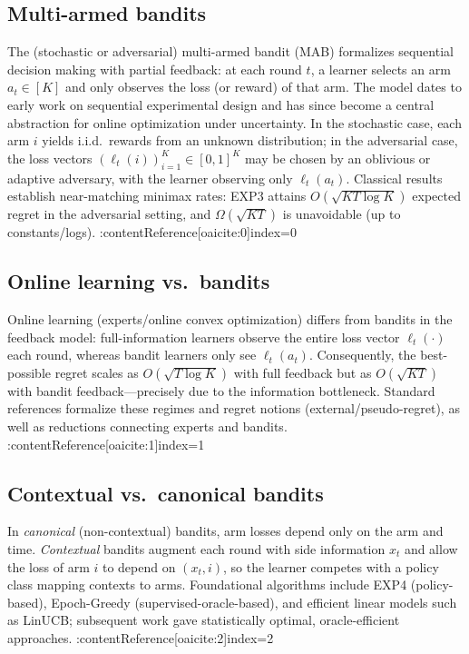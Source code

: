 \documentclass[10pt,twocolumn]{article}
\theoremstyle{definition}
\theoremstyle{remark}
\begin{document}
\subsection{Multi-armed bandits}
The (stochastic or adversarial) multi-armed bandit (MAB) formalizes sequential decision making with partial feedback: at each round $t$, a learner selects an arm $a_t\in[K]$ and only observes the loss (or reward) of that arm. The model dates to early work on sequential experimental design \citep{Robbins1952} and has since become a central abstraction for online optimization under uncertainty. In the stochastic case, each arm $i$ yields i.i.d.\ rewards from an unknown distribution; in the adversarial case, the loss vectors $(\ell_t(i))_{i=1}^K\in[0,1]^K$ may be chosen by an oblivious or adaptive adversary, with the learner observing only $\ell_t(a_t)$. Classical results establish near-matching minimax rates: EXP3 attains $O(\sqrt{KT\log K})$ expected regret in the adversarial setting, and $\Omega(\sqrt{KT})$ is unavoidable (up to constants/logs). \citep{Auer2002Nonstochastic,BubeckCesaBianchi2012,LS20}  :contentReference[oaicite:0]{index=0}

\subsection{Online learning vs.\ bandits}
Online learning (experts/online convex optimization) differs from bandits in the feedback model: full-information learners observe the entire loss vector $\ell_t(\cdot)$ each round, whereas bandit learners only see $\ell_t(a_t)$. Consequently, the best-possible regret scales as $O(\sqrt{T\log K})$ with full feedback but as $O(\sqrt{KT})$ with bandit feedback—precisely due to the information bottleneck. Standard references formalize these regimes and regret notions (external/pseudo-regret), as well as reductions connecting experts and bandits. \citep{CBL2006,ShalevShwartz2012,BubeckCesaBianchi2012}  :contentReference[oaicite:1]{index=1}

\subsection{Contextual vs.\ canonical bandits}
In \emph{canonical} (non-contextual) bandits, arm losses depend only on the arm and time. \emph{Contextual} bandits augment each round with side information $x_t$ and allow the loss of arm $i$ to depend on $(x_t,i)$, so the learner competes with a policy class mapping contexts to arms. Foundational algorithms include EXP4 (policy-based), Epoch-Greedy (supervised-oracle-based), and efficient linear models such as LinUCB; subsequent work gave statistically optimal, oracle-efficient approaches. \citep{LangfordZhang2007,LiChuLangfordSchapire2010,ChuLiReyzinSchapire2011,AgarwalEtAl2014,BubeckCesaBianchi2012}  :contentReference[oaicite:2]{index=2}
\end{document}
